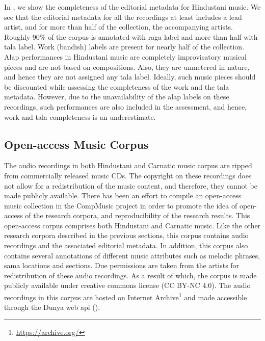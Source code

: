 In , we show the completeness of the editorial metadata for Hindustani music. We see that the editorial metadata for all the recordings at least includes a lead artist, and for more than half of the collection, the accompanying artists. Roughly 90\% of the corpus is annotated with \gls{raga} label and more than half with \gls{tala} label. Work (bandish) labels are present for nearly half of the collection. \gls{Alap} performances in Hindustani music are completely improvisatory musical pieces and are not based on compositions. Also, they are unmetered in nature, and hence they are not assigned any \gls{tala} label. Ideally, such music pieces should be discounted while assessing the completeness of the work and the \gls{tala} metadata. However, due to the unavailability of the \gls{alap} labels on these recordings, such performances are also included in the assessment, and hence, work and \gls{tala} completeness is an underestimate.



\subsection{Open-access Music Corpus}
\label{sec:corpus_open_access_research_corpus}

The audio recordings in both Hindustani and Carnatic music corpus are ripped from commercially released music CDs. The copyright on these recordings does not allow for a redistribution of the music content, and therefore, they cannot be made publicly available. There has been an effort to compile an open-access music collection in the CompMusic project in order to promote the idea of open-access of the research corpora, and reproducibility of the research results. This open-access corpus comprises both Hindustani and Carnatic music. Like the other research corpora described in the previous sections, this corpus contains audio recordings and the associated editorial metadata. In addition, this corpus also contains several annotations of different music attributes such as melodic phrases, sama locations and sections. Due permissions are taken from the artists for redistribution of these audio recordings. As a result of which, the corpus is made publicly available under creative commons license (CC BY-NC 4.0). The audio recordings in this corpus are hosted on Internet Archive\footnote{\url{https://archive.org/}} and made accessible through the Dunya web \gls{api} (). 



